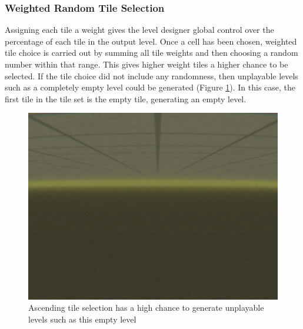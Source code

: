 \subsubsection{Weighted Random Tile Selection}
Assigning each tile a weight gives the level designer global control over the percentage of each tile in the output level. Once a cell has been chosen, weighted tile choice is carried out by summing all tile weights and then choosing a random number within that range. This gives higher weight tiles a higher chance to be selected. If the tile choice did not include any randomness, then unplayable levels such as a completely empty level could be generated (Figure \ref{fig:ascendingTileSelection}). In this case, the first tile in the tile set is the empty tile, generating an empty level.

\begin{figure}[H]
    \centering
    \includegraphics[width=\textwidth, height=0.2\textheight, keepaspectratio]{Images/TileSelectionAscending.jpg}
    \caption{Ascending tile selection has a high chance to generate unplayable levels such as this empty level}
    \label{fig:ascendingTileSelection}
\end{figure}

